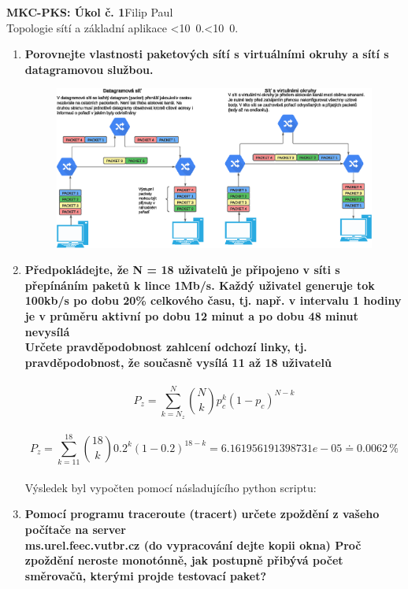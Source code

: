 \documentclass[10pt, a4paper]{article}%
\def\mydate{\leavevmode\hbox{\twodigits\day.\twodigits\month.\the\year}}
\def\twodigits#1{\ifnum#1<10 0\fi\the#1}
\begin{document}
\begin{flushleft}%
	\textbf{\Large{MKC-PKS: Úkol č. 1}}\hfill Filip Paul\\
	\large{Topologie sítí a základní aplikace \hfill\mydate}
\end{flushleft}
	\begin{enumerate}
		\item \textbf{Porovnejte vlastnosti paketových sítí s virtuálními okruhy a sítí s datagramovou službou.}\\
		\begin{figure}[ht!]
			\centering
			\includegraphics[width = 1\textwidth]{virtual_vs_datagram.eps}
		\end{figure}
		\item \textbf{Předpokládejte, že N = 18 uživatelů je připojeno v síti s přepínáním paketů k lince 1Mb/s. Každý 
		uživatel generuje tok 100kb/s po dobu 20\% celkového času, tj. např. v intervalu 1 hodiny je v průměru 
		aktivní po dobu 12 minut a po dobu 48 minut nevysílá\\
		Určete pravděpodobnost zahlcení odchozí linky, tj. pravděpodobnost, že současně vysílá 11 až 18
		uživatelů\\}\\
		\[P_z = \sum_{k = N_z}^{N} \binom{N}{k}p_c^k(1-p_c)^{N-k} \]\\
		\[P_z = \sum_{k = 11}^{18} \binom{18}{k}0.2^k(1-0.2)^{18-k} = 6.161956191398731e-05 \doteq  0.0062\,\% \]\\
		Výsledek byl vypočten pomocí násladujícího python scriptu:\\
		
		\clearpage
		\item \textbf{Pomocí programu traceroute (tracert) určete zpoždění z vašeho počítače na server\\
		ms.urel.feec.vutbr.cz (do vypracování dejte kopii okna) Proč zpoždění neroste monotónně,
		jak postupně přibývá počet směrovačů, kterými projde testovací paket?}


\end{enumerate}
\end{document}
